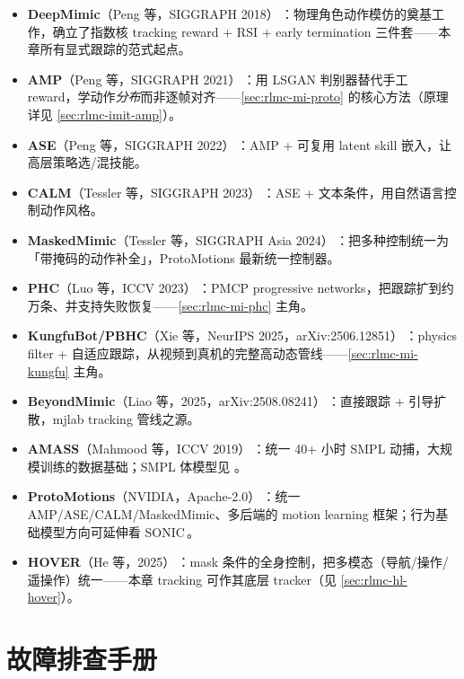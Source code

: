 \begin{itemize}
  \item \textbf{DeepMimic}（Peng 等，SIGGRAPH 2018）\,\cite{peng2018deepmimic}：物理角色动作模仿的奠基工作，确立了指数核 tracking reward + RSI + early termination 三件套——本章所有显式跟踪的范式起点。
  \item \textbf{AMP}（Peng 等，SIGGRAPH 2021）\,\cite{peng2021amp}：用 LSGAN 判别器替代手工 reward，学动作\emph{分布}而非逐帧对齐——\cref{sec:rlmc-mi-proto} 的核心方法（原理详见 \cref{sec:rlmc-imit-amp}）。
  \item \textbf{ASE}（Peng 等，SIGGRAPH 2022）\,\cite{peng2022ase}：AMP + 可复用 latent skill 嵌入，让高层策略选/混技能。
  \item \textbf{CALM}（Tessler 等，SIGGRAPH 2023）\,\cite{tessler2023calm}：ASE + 文本条件，用自然语言控制动作风格。
  \item \textbf{MaskedMimic}（Tessler 等，SIGGRAPH Asia 2024）\,\cite{tessler2024maskedmimic}：把多种控制统一为「带掩码的动作补全」，ProtoMotions 最新统一控制器。
  \item \textbf{PHC}（Luo 等，ICCV 2023）\,\cite{luo2023phc}：PMCP progressive networks，把跟踪扩到约万条、并支持失败恢复——\cref{sec:rlmc-mi-phc} 主角。
  \item \textbf{KungfuBot/PBHC}（Xie 等，NeurIPS 2025，arXiv:2506.12851）\,\cite{xie2025kungfubot}：physics filter + 自适应跟踪，从视频到真机的完整高动态管线——\cref{sec:rlmc-mi-kungfu} 主角。
  \item \textbf{BeyondMimic}（Liao 等，2025，arXiv:2508.08241）\,\cite{liao2025beyondmimic}：直接跟踪 + 引导扩散，mjlab tracking 管线之源。
  \item \textbf{AMASS}（Mahmood 等，ICCV 2019）\,\cite{mahmood2019amass}：统一 40+ 小时 SMPL 动捕，大规模训练的数据基础；SMPL 体模型见 \cite{loper2015smpl}。
  \item \textbf{ProtoMotions}（NVIDIA，Apache-2.0）\,\cite{protomotions2024}：统一 AMP/ASE/CALM/MaskedMimic、多后端的 motion learning 框架；行为基础模型方向可延伸看 SONIC\,\cite{luo2025sonic}。
  \item \textbf{HOVER}（He 等，2025）\,\cite{he2025hover}：mask 条件的全身控制，把多模态（导航/操作/遥操作）统一——本章 tracking 可作其底层 tracker（见 \cref{sec:rlmc-hl-hover}）。
\end{itemize}

\section*{故障排查手册}
\label{sec:rlmc-mi-troubleshoot}

